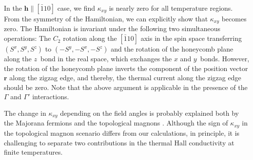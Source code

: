 \documentclass[twocolumn,superscriptaddress,showpacs, longbibliography, aps, prb]{revtex4-2}
\def\vec#1{\boldsymbol #1}
\newcommand{\blue}[1]{\textcolor{blue}{#1}}
\newcommand{\orange}[1]{\textcolor{orange}{#1}}
\begin{document}
In the $\vec{h}\parallel [\bar{1}10]$ case, we find %
$\kappa_{xy}$ is nearly zero for all temperature %
regions.
From the symmetry of the Hamiltonian, we can explicitly show that $\kappa_{xy}$ becomes zero. The Hamiltonian is invariant under the following two simultaneous operations: %
The $C_2$ rotation along the $[\bar{1}10]$ axis in the spin space transferring $(S^x,S^y,S^z)$ to $(-S^y,-S^x,-S^z)$ and the rotation of the honeycomb plane along the $z$~bond in the real space, which exchanges the $x$ and $y$~bonds.
However, the rotation of the honeycomb plane inverts the component of the position vector $\bm{r}$ along the zigzag edge, and thereby, the thermal current along the zigzag edge should be zero.
Note that the above argument is applicable in the presence of the $\Gamma$ and $\Gamma'$ interactions.

The change %
in $\kappa_{xy}$ depending on the field angles is probably explained both by the Majorana fermions \cite{Kitaev2006} and the topological magnons \cite{McClarty_PRB2018, Joshi_PRB2018, ChernZK2021}. Although the sign of $\kappa_{xy}$ in the %
topological magnon scenario %
differs from our calculations, in principle, it is %
challenging to separate two contributions in the thermal Hall conductivity at %
finite %
temperatures.

\end{document}
